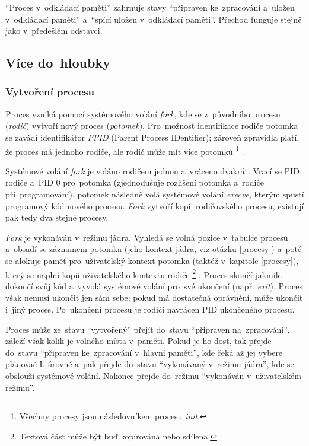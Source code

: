 \enquote{Proces v~odkládací paměti} zahrnuje stavy \enquote{připraven ke~zpracování a~uložen v~odkládací paměti} a~\enquote{spící uložen v~odkládací paměti}. Přechod funguje stejně jako v~předešlém odstavci. 

\subsection{Více do~hloubky}

\subsubsection{Vytvoření procesu}

Proces vzniká pomocí systémového volání \emph{fork}, kde se z~původního procesu (\emph{rodič}) vytvoří nový proces (\emph{potomek}). Pro~možnost identifikace rodiče potomka se zavádí identifikátor \emph{PPID} (Parent Process IDentifier); zároveň zpravidla platí, že proces má jednoho rodiče, ale rodič může mít více potomků%
\footnote{Všechny procesy jsou následovníkem procesu \emph{init}.}%
.

Systémové volání \emph{fork} je voláno rodičem jednou a~vráceno dvakrát. Vrací se PID rodiče a~PID 0 pro~potomka (zjednodušuje rozlišení potomka a~rodiče při~programování), potomek následně volá systémové volání \emph{execve}, kterým spustí programový kód nového procesu. \emph{Fork} vytvoří kopii rodičovského procesu, existují pak tedy dva stejné procesy.

\emph{Fork} je vykonáván v~režimu jádra. Vyhledá se volná pozice v~tabulce procesů a~obsadí se záznamem potomka (jeho kontext jádra, viz otázku \ref{procesy}) a~poté se alokuje paměť pro~uživatelský kontext potomka (taktéž v~kapitole \ref{procesy}), který se naplní kopií uživatelského kontextu rodiče%
\footnote{Textová část může být buď kopírována nebo sdílena.}%
. Proces skončí jakmile dokončí svůj kód a~vyvolá systémové volání pro~své ukončení (např. \emph{exit}). Proces však nemusí ukončit jen sám sebe; pokud má dostatečná oprávnění, může ukončit i~jiný proces. Po~ukončení procesu je rodiči navrácen PID ukončeného procesu.

Proces může ze~stavu \enquote{vytvořený} přejít do~stavu \enquote{připraven na~zpracování}, záleží však kolik je volného místa v~paměti. Pokud je ho dost, tak přejde do~stavu \enquote{připraven ke~zpracování v~hlavní paměti}, kde čeká až jej vybere plánovač I. úrovně a~pak přejde do~stavu \enquote{vykonávaný v~režimu jádra}, kde se obslouží systémové volání. Nakonec přejde do~režimu \enquote{vykonáván v~uživatelském režimu}.

